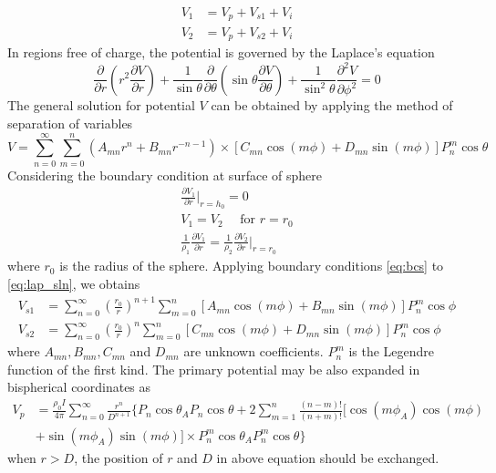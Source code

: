 \documentclass[11pt,letterpaper,leqno]{amsart}
\numberwithin{equation}{section}
\begin{document}
\begin{align}
V_1 &= V_p + V_{s1} + V_i \\
V_2 &= V_p + V_{s2} + V_i
\end{align}
In regions free of charge, the potential is governed by the Laplace's equation
\begin{equation}\label{eq:laplace_eq}
\frac{\partial}{\partial r}(r^2\frac{\partial V}{\partial r}) + \frac{1}{\sin\theta}\frac{\partial}{\partial\theta}(\sin\theta\frac{\partial V}{\partial\theta}) + \frac{1}{\sin^2\theta}\frac{\partial^2 V}{\partial\phi^2} = 0
\end{equation}
The general solution for potential $V$ can be obtained by applying the method of separation of variables 
\begin{equation}\label{eq:lap_sln}
V = \sum\limits_{n=0}^\infty \sum\limits_{m=0}^n (A_{mn}r^n + B_{mn}r^{-n-1}) \times [C_{mn}\cos(m\phi) + D_{mn}\sin(m\phi)]P_n^m\cos\theta
\end{equation}
Considering the boundary condition at surface of sphere
\begin{subequations}
\begin{align}\label{eq:bcs}
\frac{\partial V_1}{\partial r}|_{r=h_0} = 0 \\
V_1 = V_2 \quad \text{ for } r = r_0 \\
\frac{1}{\rho_1}\frac{\partial V_1}{\partial r} = \frac{1}{\rho_2}\frac{\partial V_2}{\partial r}|_{r=r_0}
\end{align}
\end{subequations}
where $r_0$ is the radius of the sphere. Applying boundary conditions \eqref{eq:bcs} to \eqref{eq:lap_sln}, we obtains 
\begin{align}
V_{s1} &= \sum\limits_{n=0}^\infty(\frac{r_0}{r})^{n+1}\sum\limits_{m=0}^n [A_{mn}\cos(m\phi) + B_{mn}\sin(m\phi)]P_n^m \cos\phi \label{eq:sp1}\\
V_{s2} &=\sum\limits_{n=0}^\infty(\frac{r_0}{r})^{n}\sum\limits_{m=0}^n [C_{mn}\cos(m\phi) + D_{mn}\sin(m\phi)]P_n^m \cos\phi \label{eq:sp2}
\end{align}
where $A_{mn}, B_{mn}, C_{mn}$ and $D_{mn}$ are unknown coefficients. $P_n^m$ is the Legendre function of the first kind. The primary potential may be also expanded in bispherical coordinates as
\begin{equation}\label{eq:primary_p}
\begin{split}
V_p &= \frac{\rho_0I}{4\pi}\sum\limits_{n=0}^\infty\frac{r^n}{D^{n+1}}\{P_n\cos\theta_A P_n\cos\theta + 2\sum\limits_{m=1}^n\frac{(n-m)!}{(n+m)!}[\cos(m\phi_A)\cos(m\phi) \\
&+ \sin(m\phi_A)\sin(m\phi)] \times P_n^m\cos\theta_A P_n^m\cos\theta \}
\end{split}
\end{equation}
when $r > D$, the position of $r$ and $D$ in above equation should be exchanged.  
\end{document}
